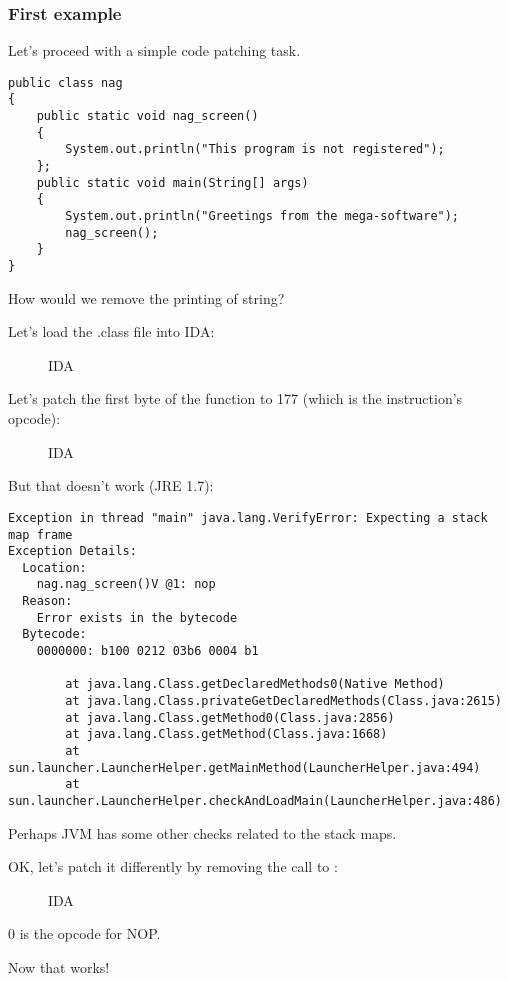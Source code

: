 \subsubsection{First example}

Let's proceed with a simple code patching task.

\begin{lstlisting}
public class nag
{
	public static void nag_screen()
	{
		System.out.println("This program is not registered");
	};
	public static void main(String[] args) 
	{
		System.out.println("Greetings from the mega-software");
		nag_screen();
	}
}
\end{lstlisting}

How would we remove the printing of  string?


Let's load the .class file into IDA:


\begin{figure}[H]
\centering
{}
\caption{IDA}
\end{figure}

Let's patch the first byte of the function to 177 (which is the  instruction's opcode):


\begin{figure}[H]
\centering
{}
\caption{IDA}
\end{figure}

But that doesn't work (JRE 1.7):

\begin{lstlisting}
Exception in thread "main" java.lang.VerifyError: Expecting a stack map frame
Exception Details:
  Location:
    nag.nag_screen()V @1: nop
  Reason:
    Error exists in the bytecode
  Bytecode:
    0000000: b100 0212 03b6 0004 b1

        at java.lang.Class.getDeclaredMethods0(Native Method)
        at java.lang.Class.privateGetDeclaredMethods(Class.java:2615)
        at java.lang.Class.getMethod0(Class.java:2856)
        at java.lang.Class.getMethod(Class.java:1668)
        at sun.launcher.LauncherHelper.getMainMethod(LauncherHelper.java:494)
        at sun.launcher.LauncherHelper.checkAndLoadMain(LauncherHelper.java:486)
\end{lstlisting}

Perhaps JVM has some other checks related to the stack maps.%


OK, let's patch it differently by removing the call to :


\begin{figure}[H]
\centering
{}
\caption{IDA}
\end{figure}

0 is the opcode for \ac{NOP}.


Now that works!
